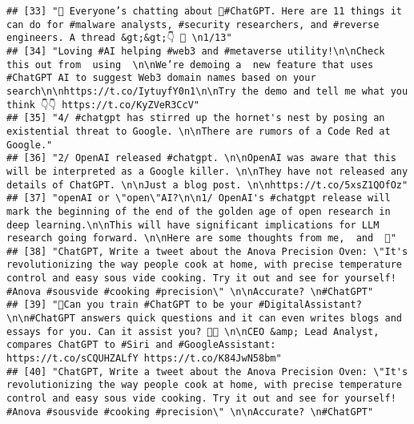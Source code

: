 \documentclass[
]{article}
\begin{document}
\begin{verbatim}
## [33] "🧵 Everyone’s chatting about 🤖#ChatGPT. Here are 11 things it can do for #malware analysts, #security researchers, and #reverse engineers. A thread &gt;&gt;👇 🧵 \n1/13"                                                                                                                                                            
## [34] "Loving #AI helping #web3 and #metaverse utility!\n\nCheck this out from  using  \n\nWe’re demoing a  new feature that uses #ChatGPT AI to suggest Web3 domain names based on your search\n\nhttps://t.co/IytuyfY0n1\n\nTry the demo and tell me what you think 👇👇 https://t.co/KyZVeR3CcV"                                          
## [35] "4/ #chatgpt has stirred up the hornet's nest by posing an existential threat to Google. \n\nThere are rumors of a Code Red at Google."                                                                                                                                                                                                
## [36] "2/ OpenAI released #chatgpt. \n\nOpenAI was aware that this will be interpreted as a Google killer. \n\nThey have not released any details of ChatGPT. \n\nJust a blog post. \n\nhttps://t.co/5xsZ1QOfOz"                                                                                                                             
## [37] "openAI or \"open\"AI?\n\n1/ OpenAI's #chatgpt release will mark the beginning of the end of the golden age of open research in deep learning.\n\nThis will have significant implications for LLM research going forward. \n\nHere are some thoughts from me,  and  🧵"                                                                
## [38] "ChatGPT, Write a tweet about the Anova Precision Oven: \"It's revolutionizing the way people cook at home, with precise temperature control and easy sous vide cooking. Try it out and see for yourself! #Anova #sousvide #cooking #precision\" \n\nAccurate? \n#ChatGPT"                                                             
## [39] "📱Can you train #ChatGPT to be your #DigitalAssistant? \n\n#ChatGPT answers quick questions and it can even writes blogs and essays for you. Can it assist you? 👩‍💻 \n\nCEO &amp; Lead Analyst,  compares ChatGPT to #Siri and #GoogleAssistant: https://t.co/sCQUHZALfY https://t.co/K84JwN58bm"                                    
## [40] "ChatGPT, Write a tweet about the Anova Precision Oven: \"It's revolutionizing the way people cook at home, with precise temperature control and easy sous vide cooking. Try it out and see for yourself! #Anova #sousvide #cooking #precision\" \n\nAccurate? \n#ChatGPT"                                                             

\end{verbatim}
\end{document}
